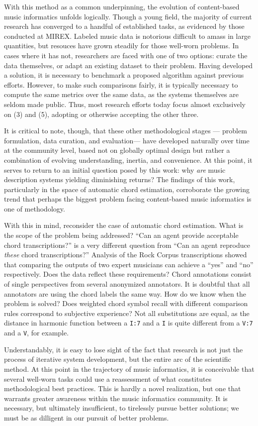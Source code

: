 With this method as a common underpinning, the evolution of content-based music informatics unfolds logically.
Though a young field, the majority of current research has converged to a handful of established tasks, as evidenced by those conducted at MIREX.
Labeled music data is notorious difficult to amass in large quantities, but resouces have grown steadily for those well-worn problems.
In cases where it has not, researchers are faced with one of two options:
curate the data themselves, or adapt an existing dataset to their problem.
Having developed a solution, it is necessary to benchmark a proposed algorithm against previous efforts.
However, to make such comparisons fairly, it is typically necessary to compute the same metrics over the same data, as the systems themselves are seldom made public.
Thus, most research efforts today focus almost exclusively on (3) and (5), adopting or otherwise accepting the other three.

It is critical to note, though, that these other methodological stages --- problem formulation, data curation, and evaluation--- have developed naturally over time at the community level, based not on globally optimal design but rather a combination of evolving understanding, inertia, and convenience.
At this point, it serves to return to an initial question posed by this work:
why \emph{are} music description systems yielding diminishing returns?
The findings of this work, particularly in the space of automatic chord estimation, corroborate the growing trend that perhaps the biggest problem facing content-based music informatics is one of methodology.

With this in mind, reconsider the case of automatic chord estimation.
What is the scope of the problem being addressed?
``Can an agent provide acceptable chord transcriptions?'' is a very different question from ``Can an agent reproduce \emph{these} chord transcriptions?''
Analysis of the Rock Corpus transcriptions showed that comparing the outputs of two expert musicians can achieve a ``yes'' and ``no'' respectively.
Does the data reflect these requirements?
Chord annotations consist of single perspectives from several anonymized annotators.
It is doubtful that all annotators are using the chord labels the same way.
How do we know when the problem is solved?
Does weighted chord symbol recall with different comparison rules correspond to subjective experience?
Not all substitutions are equal, as the distance in harmonic function between a \texttt{I:7} and a \texttt{I} is quite different from a \texttt{V:7} and a \texttt{V}, for example.

Understandably, it is easy to lose sight of the fact that research is not just the process of iterative system development, but the entire arc of the scientific method.
At this point in the trajectory of music informatics, it is conceivable that several well-worn tasks could use a reassessment of what constitutes methodological best practices.
This is hardly a novel realization, but one that warrants greater awareness within the music informatics community.
It is necessary, but ultimately insufficient, to tirelessly pursue better solutions;
we must be as dilligent in our pursuit of better problems.

